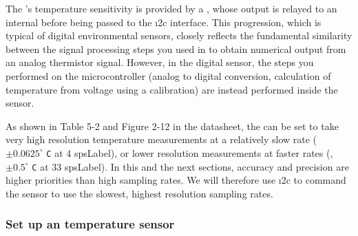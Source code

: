 The 's temperature sensitivity is provided by a , whose output is relayed to an internal \adc before being passed to the \i2c interface.
This progression, which is typical of digital environmental sensors, closely reflects the fundamental similarity between the signal processing steps you used in  to obtain numerical output from an analog thermistor signal.
However, in the digital sensor, the steps you performed on the microcontroller (analog to digital conversion, calculation of temperature from voltage using a calibration) are instead performed inside the sensor.

As shown in Table 5-2 and Figure 2-12 in the datasheet, the  can be set to take very high resolution temperature measurements at a relatively slow rate ($\pm 0.0625^\circ$ \texttt{C} at 4 \gls{spsLabel}), or lower resolution measurements at faster rates (\eg,$\pm 0.5 ^\circ$ \texttt{C} at 33 \gls{spsLabel}).
In this and the next sections, accuracy and precision are higher priorities than high sampling rates.
We will therefore use \i2c to command the sensor to use the slowest, highest resolution sampling rates.

\subsubsection{\howto Set up an  temperature sensor}

